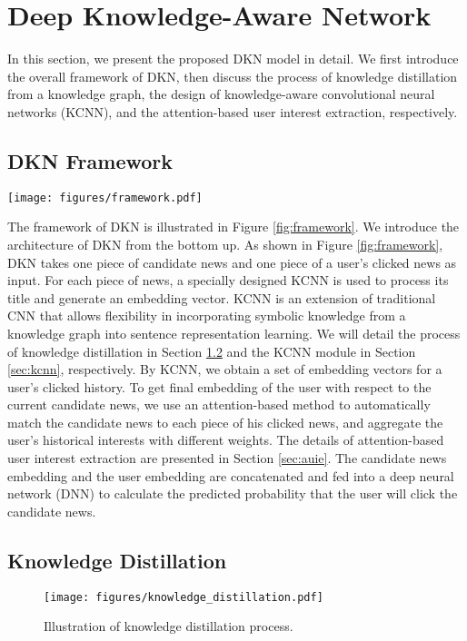 \documentclass[sigconf]{acmart}
\begin{document}
\section{Deep Knowledge-Aware Network}
	In this section, we present the proposed DKN model in detail.
	We first introduce the overall framework of DKN, then discuss the process of knowledge distillation from a knowledge graph, the design of knowledge-aware convolutional neural networks (KCNN), and the attention-based user interest extraction, respectively.
	
	\subsection{DKN Framework}
		\begin{figure*}[t]
			\centering
  			\texttt{[image: figures/framework.pdf]}
  			\caption{Illustration of the DKN framework.}
  			\label{fig:framework}
		\end{figure*}
	
		The framework of DKN is illustrated in Figure \ref{fig:framework}.
		We introduce the architecture of DKN from the bottom up.
		As shown in Figure \ref{fig:framework}, DKN takes one piece of candidate news and one piece of a user's clicked news as input.
		For each piece of news, a specially designed KCNN is used to process its title and generate an embedding vector.
		KCNN is an extension of traditional CNN that allows flexibility in incorporating symbolic knowledge from a knowledge graph into sentence representation learning.
		We will detail the process of knowledge distillation in Section \ref{sec:kd} and the KCNN module in Section \ref{sec:kcnn}, respectively.
		By KCNN, we obtain a set of embedding vectors for a user's clicked history.
		To get final embedding of the user with respect to the current candidate news, we use an attention-based method to automatically match the candidate news to each piece of his clicked news, and aggregate the user's historical interests with different weights.
		The details of attention-based user interest extraction are presented in Section \ref{sec:auie}.
		The candidate news embedding and the user embedding are concatenated and fed into a deep neural network (DNN) to calculate the predicted probability that the user will click the candidate news.
	
	
	\subsection{Knowledge Distillation}
	\label{sec:kd}
		\begin{figure}[t]
			\centering
  			\texttt{[image: figures/knowledge\_distillation.pdf]}
  			\caption{Illustration of knowledge distillation process.}
  			\label{fig:knowledge_distillation}
		\end{figure}
		
\end{document}
